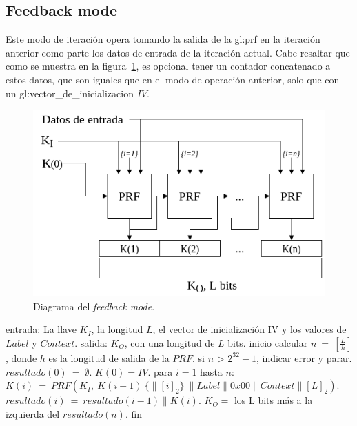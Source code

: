 \subsection{Feedback mode}
Este modo de iteración opera tomando la salida de la \gls{gl:prf} en la
iteración anterior como parte los datos de entrada de la iteración actual.
Cabe resaltar que como se muestra en la figura~\ref{diagrama_feedback_mode},
es opcional tener un contador concatenado a estos datos, que son iguales que
en el modo de operación anterior, solo que con un
\gls{gl:vector_de_inicializacion} $IV$.

\begin{figure}
  \begin{center}
    \includegraphics[width=0.75\linewidth]{diagramas/feedback_mode}
    \caption{Diagrama del \textit{feedback mode}.}
    \label{diagrama_feedback_mode}
   \end{center}
\end{figure}

\begin{pseudocodigo}[caption={Funcionamiento del \textit{feedback mode}.},
label={mi:2}]
    entrada:   La llave $K_I$, la longitud $L$, el vector de inicialización IV
               y los valores de $Label$ y $Context$.
    salida:    $K_O$, con una longitud de $L$ bits.
    inicio
      calcular $n\: =\: [\frac{L}{h}]$, donde $h$ es la longitud de salida de la $PRF$.
      si $n$ > $2^{32}-1$, indicar error y parar.
      $resultado(0)\: =\: \emptyset$.
      $K(0) = IV$.
      para $i=1$ hasta $n$:
        $K(i)\: = \:PRF(K_I,\: K(i-1)\: \{\parallel {[i]}_2\}\: \parallel Label \parallel 0x00 \parallel Context \parallel {[L]}_2 )$.
        $resultado(i)\: =\: resultado(i-1) \parallel K(i)$.
      $K_O =$ los L bits más a la izquierda del $resultado(n)$.
    fin
\end{pseudocodigo}

